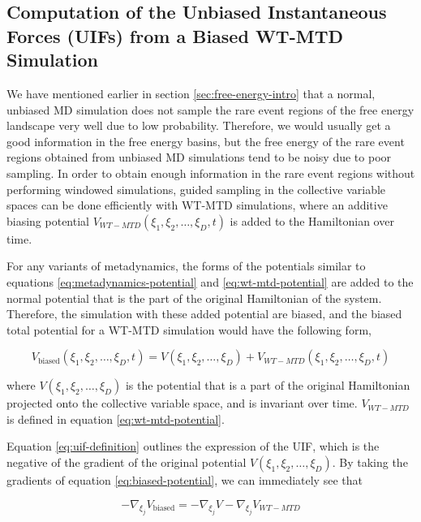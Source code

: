 \begin{spacing}{2.0}
    \subsection{Computation of the Unbiased Instantaneous Forces (UIFs) from a Biased WT-MTD Simulation}

    We have mentioned earlier in section \ref{sec:free-energy-intro} that a normal, unbiased MD simulation does not sample the rare 
    event regions of the free energy landscape very well due to low probability. Therefore, we would usually get a good information
    in the free energy basins, but the free energy of the rare event regions obtained from unbiased MD simulations tend to be
    noisy due to poor sampling. In order to obtain enough information in the rare event regions without performing windowed simulations,
    guided sampling in the collective variable spaces can be done efficiently with WT-MTD simulations, where an additive
    biasing potential $V_{WT-MTD}(\xi_1,\xi_2,\ldots,\xi_D,t)$ is added to the Hamiltonian over time.

    For any variants of metadynamics, the forms of the potentials similar to equations \ref{eq:metadynamics-potential} and 
    \ref{eq:wt-mtd-potential} are added to the normal potential that is the part of the original Hamiltonian of the system. Therefore, the 
    simulation with these added potential are biased, and the biased total potential for a WT-MTD simulation would have the following form,

    \begin{equation}
        V_{\mathrm{biased}}(\xi_1,\xi_2,\ldots,\xi_D,t) = V(\xi_1,\xi_2,\ldots,\xi_D) + V_{WT-MTD}(\xi_1,\xi_2,\ldots,\xi_D,t)
        \label{eq:biased-potential}
    \end{equation}

    \noindent where $V(\xi_1,\xi_2,\ldots,\xi_D)$ is the potential that is a part of the original Hamiltonian projected onto the collective
    variable space, and is invariant over time. $V_{WT-MTD}$ is defined in equation \ref{eq:wt-mtd-potential}. 

    Equation \ref{eq:uif-definition} outlines the expression of the UIF, which is the negative of the gradient of the original potential
    $V(\xi_1,\xi_2,\ldots,\xi_D)$. By taking the gradients of equation \ref{eq:biased-potential}, we can immediately see that

    \begin{equation}
        -\nabla_{\xi_j}V_{\mathrm{biased}} = -\nabla_{\xi_j}V - \nabla_{\xi_j}V_{WT-MTD}
        \label{eq:potential-gradients}
    \end{equation}


\end{spacing}
